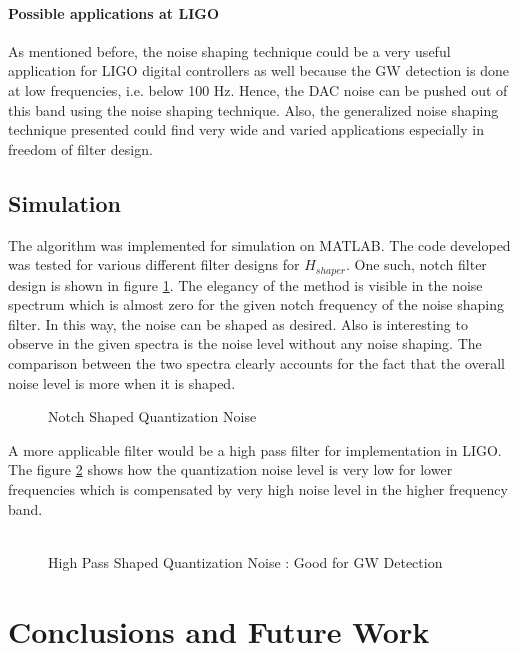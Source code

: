 \documentclass[a4paper,12pt]{article}
\begin{document}
    		\paragraph{Possible applications at LIGO} As mentioned before, the noise shaping technique could be a very useful application for LIGO digital controllers as well because the GW detection is done at low frequencies, i.e. below 100 Hz. Hence, the DAC noise can be pushed out of this band using the noise shaping technique. Also, the generalized noise shaping technique presented could find very wide and varied applications especially in freedom of filter design.
	\subsection{Simulation} The algorithm was implemented for simulation on MATLAB. The code developed was tested for various different filter designs for $H_{shaper}$. One such, notch filter design is shown in figure \ref{notch}. The elegancy of the method is visible in the noise spectrum which is almost zero for the given notch frequency of the noise shaping filter. In this way, the noise can be shaped as desired. Also is interesting to observe in the given spectra is the noise level without any noise shaping. The comparison between the two spectra clearly accounts for the fact that the overall noise level is more when it is shaped. 
	\begin{figure}[H]

  		\centering
  		
%  		
  		\caption{Notch Shaped Quantization Noise}
		\label{notch}
	\end{figure}
	A more applicable filter would be a high pass filter for implementation in LIGO. The figure \ref{highp} shows how the quantization noise level is very low for lower frequencies which is compensated by very high noise level in the higher frequency band. \\ \\
	\begin{figure}[H]

  		\centering
  		
%  		
  		\caption{High Pass Shaped Quantization Noise : Good for GW Detection}
		\label{highp}
	\end{figure}
\section{Conclusions and Future Work}
\end{document}
